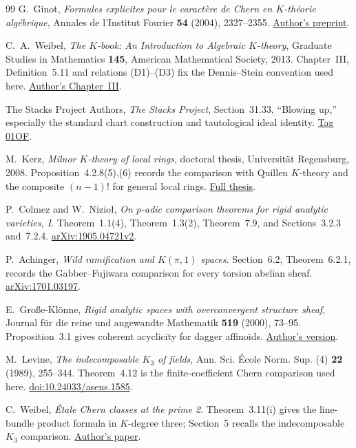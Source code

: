 \documentclass[11pt,a4paper]{article}
\theoremstyle{remark}
\begin{document}
\begin{thebibliography}{99}
G.~Ginot, \emph{Formules explicites pour le caract\`ere de Chern en $K$-th\'eorie alg\'ebrique}, Annales de l'Institut Fourier \textbf{54} (2004), 2327--2355.
\href{https://www.math.univ-paris13.fr/~ginot/papers/flecarch.pdf}{Author's preprint}.

C.~A.~Weibel, \emph{The $K$-book: An Introduction to Algebraic $K$-theory}, Graduate Studies in Mathematics \textbf{145}, American Mathematical Society, 2013. Chapter~III, Definition~5.11 and relations (D1)--(D3) fix the Dennis--Stein convention used here.
\href{https://sites.math.rutgers.edu/~weibel/Kbook/Kbook.III.pdf}{Author's Chapter~III}.

The Stacks Project Authors, \emph{The Stacks Project}, Section~31.33, ``Blowing up,'' especially the standard chart construction and tautological ideal identity.
\href{https://stacks.math.columbia.edu/tag/01OF}{Tag 01OF}.

M.~Kerz, \emph{Milnor $K$-theory of local rings}, doctoral thesis, Universit\"at Regensburg, 2008. Proposition~4.2.8(5),(6) records the comparison with Quillen $K$-theory and the composite $(n-1)!$ for general local rings.
\href{https://d-nb.info/98935329x/34}{Full thesis}.

P.~Colmez and W.~Nizio\l, \emph{On $p$-adic comparison theorems for rigid analytic varieties, I}. Theorem~1.1(4), Theorem~1.3(2), Theorem~7.9, and Sections~3.2.3 and~7.2.4.
\href{https://arxiv.org/abs/1905.04721}{arXiv:1905.04721v2}.

P.~Achinger, \emph{Wild ramification and $K(\pi,1)$ spaces}. Section~6.2, Theorem~6.2.1, records the Gabber--Fujiwara comparison for every torsion abelian sheaf.
\href{https://arxiv.org/abs/1701.03197}{arXiv:1701.03197}.

E.~Gro\ss e-Kl\"onne, \emph{Rigid analytic spaces with overconvergent structure sheaf}, Journal f\"ur die reine und angewandte Mathematik \textbf{519} (2000), 73--95. Proposition~3.1 gives coherent acyclicity for dagger affinoids.
\href{https://arxiv.org/abs/1408.3329}{Author's version}.

M.~Levine, \emph{The indecomposable $K_3$ of fields}, Ann. Sci. \'Ecole Norm. Sup. (4) \textbf{22} (1989), 255--344. Theorem~4.12 is the finite-coefficient Chern comparison used here.
\href{https://doi.org/10.24033/asens.1585}{doi:10.24033/asens.1585}.

C.~Weibel, \emph{\'Etale Chern classes at the prime 2}. Theorem~3.11(i) gives the line-bundle product formula in $K$-degree three; Section~5 recalls the indecomposable $K_3$ comparison.
\href{https://sites.math.rutgers.edu/~weibel/archive/papers-dir/chernclass.pdf}{Author's paper}.


\end{thebibliography}
\end{document}
